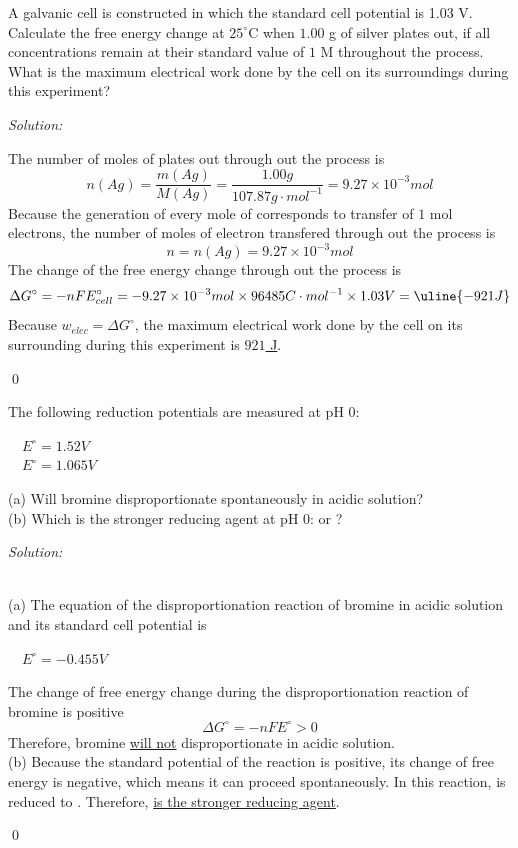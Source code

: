 \documentclass[12pt]{article}
\newenvironment{problem}[2][Problem]{\begin{trivlist}
\item[\hskip \labelsep {\bfseries #1}\hskip \labelsep {\bfseries #2.}]}{\end{trivlist}}
\newenvironment{sol}
    {\emph{Solution:}
    }
    {
    \qed
    }
\begin{document}
\begin{problem}{17.11}
A  galvanic cell is constructed in which the standard cell potential is 1.03 V. Calculate the free energy change at $25^{\circ}$C when $1.00$ g of silver plates out, if all concentrations remain at their standard value of $1$ \textsc{M} throughout the process. What is the maximum electrical work done by the cell on its surroundings during this experiment?
\end{problem}
\begin{sol}
The number of moles of  plates out through out the process is
\[
n(Ag)=\frac{m(Ag)}{M(Ag)}=\frac{1.00g}{107.87g\cdot mol^{-1}}=9.27\times10^{-3}mol
\]
Because the generation of every mole of  corresponds to transfer of $1$ mol electrons, the number of moles of electron transfered through out the process is
\[
n=n(Ag)=9.27\times10^{-3}mol
\]
The change of the free energy change through out the process is
\[
\Delta G^{\circ}=-nFE_{cell}^{\circ}=-9.27\times10^{-3}mol\times96485C\cdot mol^{-1}\times1.03V=\uline{-921J}
\]
Because $w_{elec}=\Delta G^{\circ}$, the maximum electrical work done by the cell on its surrounding during this experiment is \uline{$921$ J}.
\end{sol}

\begin{problem}{17.25}
The following reduction potentials are measured at pH 0:
\begin{center}
~~$E^{\circ}=1.52V$\\
~~$E^{\circ}=1.065V$
\end{center}
(a) Will bromine disproportionate spontaneously in acidic solution?\\
(b) Which is the stronger reducing agent at pH $0$:  or ?
\end{problem}
\begin{sol}
\\(a) The equation of the disproportionation reaction of bromine in acidic solution and its standard cell potential is
\begin{center}
~~$E^{\circ}=-0.455V$
\end{center}
The change of free energy change during the disproportionation reaction of bromine is positive
\[
\Delta G^{\circ}=-nFE^{\circ}>0
\]
Therefore, bromine \uline{will not} disproportionate in acidic solution.\\
(b) Because the standard potential of the reaction  is positive, its change of free energy is negative, which means it can proceed spontaneously. In this reaction,  is reduced to . Therefore, \uline{ is the stronger reducing agent}.
\end{sol}
\end{document}
